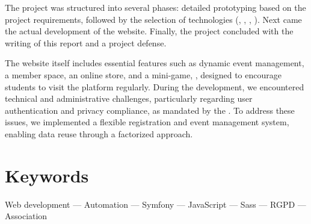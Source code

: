 The project was structured into several phases: detailed prototyping based on the project requirements, followed by the selection of technologies (, , , ). Next came the actual development of the website. Finally, the project concluded with the writing of this report and a project defense.

The website itself includes essential features such as dynamic event management, a member space, an online store, and a mini-game, \game, designed to encourage students to visit the platform regularly. During the development, we encountered technical and administrative challenges, particularly regarding user authentication and privacy compliance, as mandated by the . To address these issues, we implemented a flexible registration and event management system, enabling data reuse through a factorized approach.

\section*{Keywords}

\noindent Web development --- Automation --- Symfony --- JavaScript --- Sass --- RGPD --- Association
